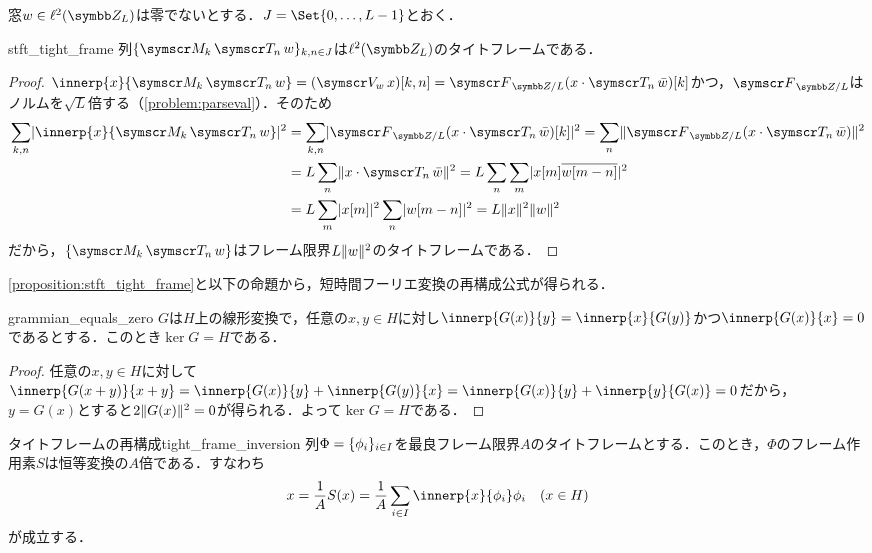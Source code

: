\documentclass[../../main]{subfiles}
\begin{document}
窓\(w\in\cycles{L}\)は零でないとする．\(J=\Set{0,\dots,L-1}\)とおく．

\begin{proposition}{}{stft_tight_frame}
  列\(\seq{\modulate{k}\translate{n}w}_{k,n\in J}\)は\(\cycles{L}\)のタイトフレームである．
\end{proposition}

\begin{proof}
  \(\innerp{x}{\modulate{k}\translate{n}w}=(\stft{w}x)[k,n]=\dft{L}(x\cdot\translate{n}\conj{w})[k]\)かつ，\(\dft{L}\)はノルムを\(\sqrt{L}\)倍する（\cref{problem:parseval}）．そのため
  \begin{align*}
    \sum_{k,n}\abs{\innerp{x}{\modulate{k}\translate{n}w}}^2 &= \sum_{k,n}\abs{\dft{L}(x\cdot\translate{n}\conj{w})[k]}^2
    = \sum_n\vnorm{\dft{L}(x\cdot\translate{n}\conj{w})}^2 \\
    &= L\sum_n\vnorm{x\cdot\translate{n}\conj{w}}^2
    = L\sum_n\sum_m\abs{x[m]\conj*{w[m-n]}}^2 \\
    &= L\sum_m\abs{x[m]}^2\sum_n\abs{w[m-n]}^2
    = L\vnorm{x}^2\vnorm{w}^2
  \end{align*}
  だから，\(\seq{\modulate{k}\translate{n}w}\)はフレーム限界\(L\lVert w\rVert^2\)のタイトフレームである．
\end{proof}

\cref{proposition:stft_tight_frame}と以下の命題から，短時間フーリエ変換の再構成公式が得られる．

\begin{lemma}{}{grammian_equals_zero}
  \(G\)は\(H\)上の線形変換で，任意の\(x,y\in H\)に対し\(\innerp{G(x)}{y}=\innerp{x}{G(y)}\)かつ\(\innerp{G(x)}{x}=0\)であるとする．このとき\(\ker G=H\)である．
\end{lemma}

\begin{proof}
  任意の\(x,y\in H\)に対して\(\innerp{G(x+y)}{x+y}=\innerp{G(x)}{y}+\innerp{G(y)}{x}=\innerp{G(x)}{y}+\innerp{y}{G(x)}=0\)だから，
  \(y=G(x)\)とすると\(2\lVert G(x)\rVert^2=0\)が得られる．よって\(\ker G=H\)である．
\end{proof}

\begin{proposition}{タイトフレームの再構成}{tight_frame_inversion}
  列\(\Phi=\lbrace\phi_i\rbrace_{i\in I}\)を最良フレーム限界\(A\)のタイトフレームとする．このとき，\(\Phi\)のフレーム作用素\(S\)は恒等変換の\(A\)倍である．すなわち
  \[
    x = \frac{1}{A}S(x)
    = \frac{1}{A}\sum_{i\in I}\innerp{x}{\phi_i}\phi_i\quad(x\in H)
  \]
  が成立する．
\end{proposition}
\end{document}
